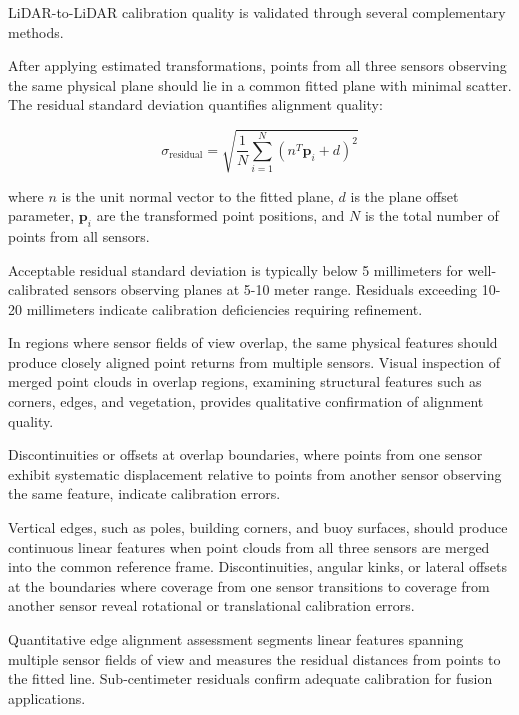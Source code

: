 
LiDAR-to-LiDAR calibration quality is validated through several complementary methods.


After applying estimated transformations, points from all three sensors observing the same physical plane should lie in a common fitted plane with minimal scatter.
The residual standard deviation quantifies alignment quality:

$$\sigma_{\text{residual}} = \sqrt{\frac{1}{N}\sum_{i=1}^{N} (n^T \mathbf{p}_i + d)^2}$$

where $n$ is the unit normal vector to the fitted plane, $d$ is the plane offset parameter, $\mathbf{p}_i$ are the transformed point positions, and $N$ is the total number of points from all sensors.

Acceptable residual standard deviation is typically below 5 millimeters for well-calibrated sensors observing planes at 5-10 meter range.
Residuals exceeding 10-20 millimeters indicate calibration deficiencies requiring refinement.


In regions where sensor fields of view overlap, the same physical features should produce closely aligned point returns from multiple sensors.
Visual inspection of merged point clouds in overlap regions, examining structural features such as corners, edges, and vegetation, provides qualitative confirmation of alignment quality.

Discontinuities or offsets at overlap boundaries, where points from one sensor exhibit systematic displacement relative to points from another sensor observing the same feature, indicate calibration errors.


Vertical edges, such as poles, building corners, and buoy surfaces, should produce continuous linear features when point clouds from all three sensors are merged into the common reference frame.
Discontinuities, angular kinks, or lateral offsets at the boundaries where coverage from one sensor transitions to coverage from another sensor reveal rotational or translational calibration errors.

Quantitative edge alignment assessment segments linear features spanning multiple sensor fields of view and measures the residual distances from points to the fitted line.
Sub-centimeter residuals confirm adequate calibration for fusion applications.

